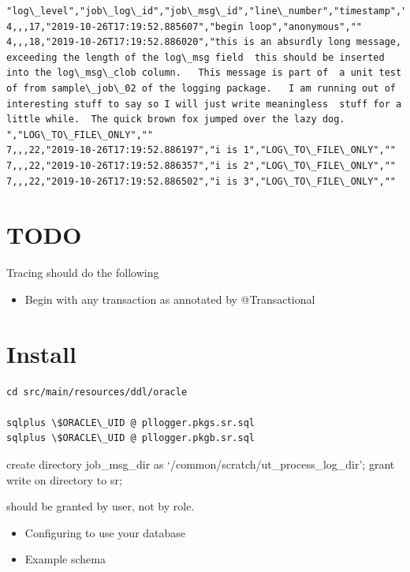 \documentclass[letterpaper,10pt,english]{sphinxmanual}
\begin{document}
\begin{Verbatim}[commandchars=\\\{\}]
"log\_level","job\_log\_id","job\_msg\_id","line\_number","timestamp","log\_msg","caller\_name","call\_stack"
4,,,17,"2019-10-26T17:19:52.885607","begin loop","anonymous",""
4,,,18,"2019-10-26T17:19:52.886020","this is an absurdly long message,  exceeding the length of the log\_msg field  this should be inserted into the log\_msg\_clob column.   This message is part of  a unit test of from sample\_job\_02 of the logging package.   I am running out of  interesting stuff to say so I will just write meaningless  stuff for a little while.  The quick brown fox jumped over the lazy dog. ","LOG\_TO\_FILE\_ONLY",""
7,,,22,"2019-10-26T17:19:52.886197","i is 1","LOG\_TO\_FILE\_ONLY",""
7,,,22,"2019-10-26T17:19:52.886357","i is 2","LOG\_TO\_FILE\_ONLY",""
7,,,22,"2019-10-26T17:19:52.886502","i is 3","LOG\_TO\_FILE\_ONLY",""
\end{Verbatim}


\chapter{TODO}
\label{index:todo}
Tracing should do the following
\begin{itemize}
\item {} 
Begin with any transaction as annotated by @Transactional

\end{itemize}


\chapter{Install}
\label{index:install}
\begin{Verbatim}[commandchars=\\\{\}]
cd src/main/resources/ddl/oracle

sqlplus \$ORACLE\_UID @ pllogger.pkgs.sr.sql
sqlplus \$ORACLE\_UID @ pllogger.pkgb.sr.sql
\end{Verbatim}

create directory job\_msg\_dir as
`/common/scratch/ut\_process\_log\_dir'; grant write on directory to sr;

should be granted by user, not by role.
\begin{itemize}
\item {} 
Configuring to use your database

\item {} 
Example schema

\end{itemize}
\end{document}

